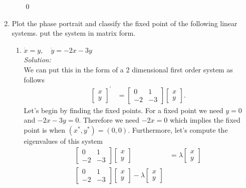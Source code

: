 \documentclass[10pt]{amsart}
\theoremstyle{nonumberplain}
\begin{document}
\begin{enumerate}[label={\bf {\arabic*}:}]
\begin{enumerate}
\qed \\

\end{enumerate}

\newpage

\item Plot the phase portrait and classify the fixed point of the following linear systems. 
put the system in matrix form. \\

\begin{enumerate}

\item $\dot x = y, \quad \dot y = -2x - 3y$ \\
\textit{Solution:} \\
We can put this in the form of a 2 dimensional first order system as follows
\begin{align*}
\begin{bmatrix}
x \\ y
\end{bmatrix}^\prime
&= \begin{bmatrix}
0 & 1 \\
-2 & -3
\end{bmatrix} \begin{bmatrix}
x \\ y
\end{bmatrix}.
\end{align*}
Let's begin by finding the fixed points.
For a fixed point we need $y = 0$ and $-2x -3y = 0$.
Therefore we need $-2x = 0$ which implies the fixed point is when $(x^*,y^*) = (0, 0)$.
Furthermore, let's compute the eigenvalues of this system
\begin{align*}
\begin{bmatrix} 0 & 1 \\ -2 & -3 \end{bmatrix}
\begin{bmatrix} x \\ y \end{bmatrix}
	&= \lambda \begin{bmatrix} x \\ y \end{bmatrix} \\
\begin{bmatrix} 0 & 1 \\ -2 & -3 \end{bmatrix}
\begin{bmatrix} x \\ y \end{bmatrix} - \lambda \begin{bmatrix} x \\ y \end{bmatrix}

\end{align*}
\end{enumerate}
\end{enumerate}
\end{document}
